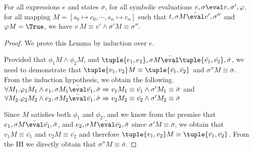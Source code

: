 \begin{lemma}
  \label{lem:soundeval}

  For all expressions $e$ and states $\sigma$,
  for all symbolic evaluations $e,\sigma\eval v,\sigma',\phi$,
  for all mapping $M=[s_0\mapsto c_0,\cdots,s_n\mapsto c_n]$
  such that $t,\sigma M \bar{\eval}v',\sigma''$ and $\phi M = \True$,
  we have $v\ M \equiv v' \wedge \sigma' M \equiv \sigma''$.

\end{lemma}

\begin{proof}
  We prove this Lemma by induction over $e$.


  {
  Provided that $\phi_1 M\wedge\phi_2 M$, and $\tuple{e_1, e_2},\sigma M\bar{\eval}\tuple{\bar{v_1},\bar{v_2}},\bar{\sigma}$,
  we need to demonstrate that $\tuple{v_1,v_2} M \equiv \tuple{\bar{v_1},\bar{v_2}}$ and $\sigma'' M\equiv\bar{\sigma}$.
  From the induction hypothesis, we obtain the following. $\forall M_1 . \phi_1 M_1 \wedge e_1,\sigma M_1\bar{\eval}\bar{v_1},\bar{\sigma}\implies v_1 M_1\equiv \bar{v_1} \wedge \sigma' M_1\equiv\bar{\sigma}$ and
  $\forall M_2 . \phi_2 M_2 \wedge e_2,\sigma M_2\bar{\eval}\bar{v_1},\bar{\sigma}\implies v_2 M_2\equiv \bar{v_2} \wedge \sigma' M_2\equiv\bar{\sigma}$

  Since $M$ satisfies both $\phi_1$ and $\phi_2$, and we know from the premise that $e_1,\sigma M\bar{\eval}\bar{v_1},\bar{\sigma}$, and $e_2,\sigma M\bar{\eval}\bar{v_2},\bar{\sigma}$ since $\sigma' M \equiv \bar{\sigma}$, we obtain that $v_1 M\equiv \bar{v_1}$ and $v_2 M\equiv \bar{v_2}$ and therefore $\tuple{v_1,v_2} M \equiv \tuple{\bar{v_1},\bar{v_2}}$.
  From the IH we directly obtain that $\sigma'' M\equiv\bar{\sigma}$.
  }













\end{proof}

